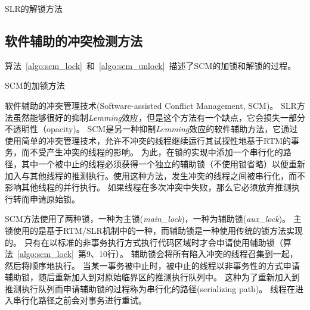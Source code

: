 \begin{algorithm}[htbp]
\SetAlgoLined
{}
\caption{SLR的解锁方法}
\label{algo:slr_unlock}
\end{algorithm}


\subsection{软件辅助的冲突检测方法}

算法~\ref{algo:scm_lock}~和~\ref{algo:scm_unlock}~描述了SCM的加锁和解锁的过程。

\begin{algorithm}[htbp]
\SetAlgoLined
{}
\caption{SCM的加锁方法}
\label{algo:scm_lock}
\end{algorithm}

软件辅助的冲突管理技术(Software-assisted Conflict Management, SCM)。
SLR方法虽然能够很好的抑制\textit{Lemming}效应，但是这个方法有一个缺点，它会损失一部分不透明性（opacity)。
SCM是另一种抑制\textit{Lemming}效应的软件辅助方法，它通过使用简单的冲突管理技术，允许不冲突的线程继续运行其试探性地基于RTM的事务，而不受产生冲突的线程的影响。
为此，在锁的实现中添加一个串行化的路径，其中一个被中止的线程必须获得一个独立的辅助锁（不使用锁省略）以便重新加入与其他线程的推测执行。使用这种方法，发生冲突的线程之间被串行化，而不影响其他线程的并行执行。
如果线程在多次冲突中失败，那么它必须放弃推测执行转而申请原始锁。

SCM方法使用了两种锁，一种为主锁(\textit{main\_lock})，一种为辅助锁(\textit{aux\_lock})。
主锁使用的是基于RTM/SLR机制中的一种，而辅助锁是一种使用传统的锁方法实现的。
只有在以标准的非事务执行方式执行代码区域时才会申请使用辅助锁（算法~\ref{algo:scm_lock}~第9、10行）。
辅助锁会将所有陷入冲突的线程召集到一起，然后将顺序地执行。
当某一事务被中止时，被中止的线程以非事务性的方式申请辅助锁，随后重新加入到对原始临界区的推测执行队列中。
这种为了重新加入到推测执行队列而申请辅助锁的过程称为串行化的路径(serializing path)。
线程在进入串行化路径之前会对事务进行重试。

